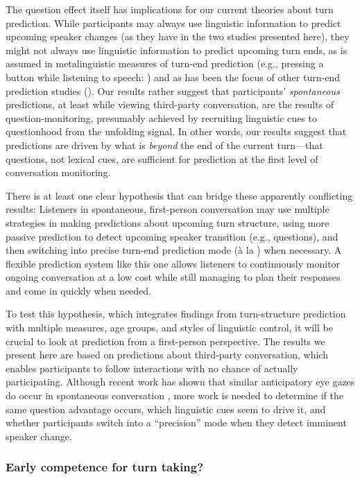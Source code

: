 \documentclass[authoryear, 12pt]{elsarticle}
\begin{document}
The question effect itself has implications for our current theories about turn prediction. While participants may always use linguistic information to predict upcoming speaker changes (as they have in the two studies presented here), they might not always use linguistic information to predict upcoming turn ends, as is assumed in metalinguistic measures of turn-end prediction (e.g., pressing a button while listening to speech: \citealp{torreira2015, magyari2012, de-ruiter2006}) and as has been the focus of other turn-end prediction studies (\citealp{ford1996, duncan1972}). Our results rather suggest that participants' \textit{spontaneous} predictions, at least while viewing third-party conversation, are the results of question-monitoring, presumably achieved by recruiting linguistic cues to questionhood from the unfolding signal. In other words, our results suggest that predictions are driven by what is \textit{beyond} the end of the current turn---that questions, not lexical cues, are sufficient for prediction at the first level of conversation monitoring.

There is at least one clear hypothesis that can bridge these apparently conflicting results: Listeners in spontaneous, first-person conversation may use multiple strategies in making predictions about upcoming turn structure, using more passive prediction to detect upcoming speaker transition (e.g., questions), and then switching into precise turn-end prediction mode (\`{a} la \citealp{de-ruiter2006}) when necessary. A flexible prediction system like this one allows listeners to continuously monitor ongoing conversation at a low cost while still managing to plan their responses and come in quickly when needed.

To test this hypothesis, which integrates findings from turn-structure prediction with multiple measures, age groups, and styles of linguistic control, it will be crucial to look at prediction from a first-person perspective. The results we present here are based on predictions about third-party conversation, which enables participants to follow interactions with no chance of actually participating. Although recent work has shown that similar anticipatory eye gazes do occur in spontaneous conversation \citep{holler2015}, more work is needed to determine if the same question advantage occurs, which linguistic cues seem to drive it, and whether participants switch into a ``precision'' mode when they detect imminent speaker change.

\subsubsection{Early competence for turn taking?}
\end{document}
